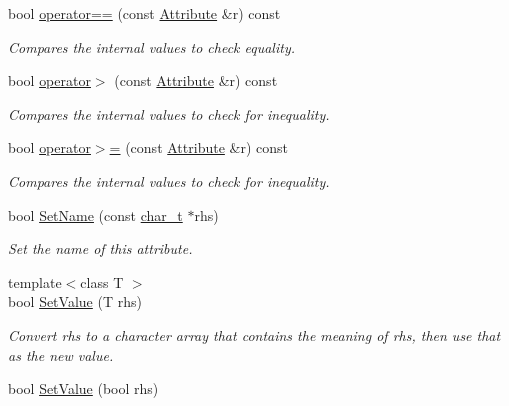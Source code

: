 \begin{DoxyCompactItemize}
bool \hyperlink{classphys_1_1xml_1_1Attribute_a68b6ba1299cc9a2019ec97b10bb8978b}{operator==} (const \hyperlink{classphys_1_1xml_1_1Attribute}{Attribute} \&r) const 
\begin{DoxyCompactList}\small\item\em Compares the internal values to check equality. \item\end{DoxyCompactList}\item 
bool \hyperlink{classphys_1_1xml_1_1Attribute_ac778ad4d7aa3a179217de1425e220848}{operator$>$} (const \hyperlink{classphys_1_1xml_1_1Attribute}{Attribute} \&r) const 
\begin{DoxyCompactList}\small\item\em Compares the internal values to check for inequality. \item\end{DoxyCompactList}\item 
bool \hyperlink{classphys_1_1xml_1_1Attribute_ab1d63c57891107848492dc3316c95455}{operator$>$=} (const \hyperlink{classphys_1_1xml_1_1Attribute}{Attribute} \&r) const 
\begin{DoxyCompactList}\small\item\em Compares the internal values to check for inequality. \item\end{DoxyCompactList}\item 
bool \hyperlink{classphys_1_1xml_1_1Attribute_af669654308122897f98858563375bf4c}{SetName} (const \hyperlink{namespacephys_1_1xml_afc87705cd1c2917d87b879715a2d8f6e}{char\_\-t} $\ast$rhs)
\begin{DoxyCompactList}\small\item\em Set the name of this attribute. \item\end{DoxyCompactList}\item 
{\footnotesize template$<$class T $>$ }\\bool \hyperlink{classphys_1_1xml_1_1Attribute_af9b12723a227b833d7f8986a524b0e48}{SetValue} (T rhs)
\begin{DoxyCompactList}\small\item\em Convert rhs to a character array that contains the meaning of rhs, then use that as the new value. \item\end{DoxyCompactList}\item 
bool \hyperlink{classphys_1_1xml_1_1Attribute_a6df4cf0f083482e69e4e6e94599a1d82}{SetValue} (bool rhs)

\end{DoxyCompactItemize}
